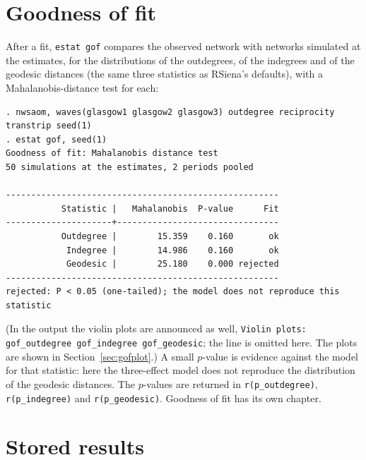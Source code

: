 \section{Goodness of fit}

After a fit, \texttt{estat gof} compares the observed network with networks simulated at the estimates, for the distributions of the outdegrees, of the indegrees and of the geodesic distances (the same three statistics as RSiena's defaults), with a Mahalanobis-distance test for each:
\begin{lstlisting}
. nwsaom, waves(glasgow1 glasgow2 glasgow3) outdegree reciprocity transtrip seed(1)
. estat gof, seed(1)
Goodness of fit: Mahalanobis distance test
50 simulations at the estimates, 2 periods pooled

------------------------------------------------------
           Statistic |   Mahalanobis  P-value      Fit
---------------------+--------------------------------
           Outdegree |        15.359    0.160       ok
            Indegree |        14.986    0.160       ok
            Geodesic |        25.180    0.000 rejected
------------------------------------------------------
rejected: P < 0.05 (one-tailed); the model does not reproduce this statistic
\end{lstlisting}
(In the output the violin plots are announced as well, \texttt{Violin plots: gof\_outdegree gof\_indegree gof\_geodesic}; the line is omitted here. The plots are shown in Section~\ref{sec:gofplot}.) A small $p$-value is evidence against the model for that statistic: here the three-effect model does not reproduce the distribution of the geodesic distances. The $p$-values are returned in \texttt{r(p\_outdegree)}, \texttt{r(p\_indegree)} and \texttt{r(p\_geodesic)}. Goodness of fit has its own chapter.

\section{Stored results}\label{sec:eresults}

